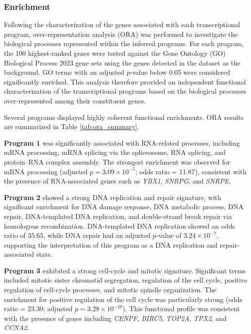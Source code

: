 \documentclass[11pt,a4paper]{article}
\begin{document}
\subsubsection{Enrichment}

Following the characterization of the genes associated with each transcriptional program, over-representation analysis (ORA) was performed to investigate the biological processes represented within the inferred programs. For each program, the 100 highest-ranked genes were tested against the Gene Ontology (GO) Biological Process 2023 gene sets using the genes detected in the dataset as the background. GO terms with an adjusted $p$-value below 0.05 were considered significantly enriched. This analysis therefore provided an independent functional characterization of the transcriptional programs based on the biological processes over-represented among their constituent genes.

Several programs displayed highly coherent functional enrichments. ORA results are summarized in Table \ref{tab:ora_summary}.

\textbf{Program 1} was significantly associated with RNA-related processes, including mRNA processing, mRNA splicing via the spliceosome, RNA splicing, and protein--RNA complex assembly. The strongest enrichment was observed for mRNA processing (adjusted $p = 3.09\times10^{-5}$; odds ratio = 11.87), consistent with the presence of RNA-associated genes such as \textit{YBX1}, \textit{SNRPG}, and \textit{SNRPE}. 

\textbf{Program 2} showed a strong DNA replication and repair signature, with significant enrichment for DNA damage response, DNA metabolic process, DNA repair, DNA-templated DNA replication, and double-strand break repair via homologous recombination. DNA-templated DNA replication showed an odds ratio of 35.65, while DNA repair had an adjusted $p$-value of $3.24\times10^{-7}$, supporting the interpretation of this program as a DNA replication and repair-associated state.

\textbf{Program 3} exhibited a strong cell-cycle and mitotic signature. Significant terms included mitotic sister chromatid segregation, regulation of the cell cycle, positive regulation of cell-cycle processes, and mitotic spindle organization. The enrichment for positive regulation of the cell cycle was particularly strong (odds ratio = 23.30; adjusted $p = 3.28\times10^{-10}$). This functional profile was consistent with the presence of genes including \textit{CENPF}, \textit{BIRC5}, \textit{TOP2A}, \textit{TPX2}, and \textit{CCNA2}. 
\end{document}
